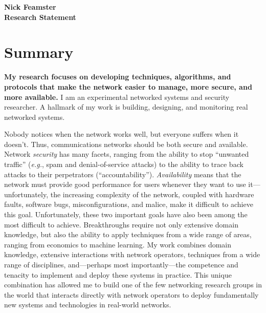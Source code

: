\documentclass{article}
\newcommand{\eg}{{\em e.g.}}
\newcommand{\fp}{\vspace*{0.08in}\noindent}
\begin{document}
\begin{center}
{\Large\textbf{Nick Feamster}}\\[0.1in] {\large\textbf{
Research Statement}}\\
\end{center}

\section*{Summary}

{\bf My research focuses on developing techniques, algorithms, and
  protocols that make the network easier to manage, more secure, and
  more available.} I am an experimental networked systems and security
researcher.  A hallmark of my work is building, designing, and
monitoring real networked systems.

\fp
Nobody notices when the network works well, but everyone suffers when it
doesn't.  Thus, communications networks should be both secure and
available.  Network {\em security} has many facets, ranging from the
ability to stop ``unwanted traffic'' (\eg, spam and denial-of-service
attacks) to the ability to trace back attacks to their perpetrators
(``accountability'').  {\em Availability} means that the network must
provide good performance for users whenever they want to use
it---unfortunately, the increasing complexity of the network, coupled
with hardware faults, software bugs, misconfigurations, and malice, make
it difficult to achieve this goal.  Unfortunately, these two important
goals have also been among the most difficult to achieve.  Breakthroughs require not
only extensive domain knowledge, but also the ability to apply techniques from
a wide range of areas, ranging from economics to machine learning.  My
work combines domain knowledge, extensive interactions with network
operators, techniques from a wide range of disciplines, and---perhaps
most importantly---the competence and tenacity to implement and deploy
these systems in practice.  This unique combination has allowed me to
build one of the few networking research groups in the world that
interacts directly with network operators to deploy fundamentally new
systems and technologies in real-world networks.
\end{document}
